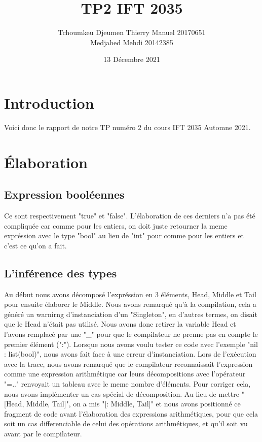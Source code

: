 \documentclass{article}
\title{TP2 IFT 2035}
\author{Tchoumkeu Djeumen Thierry Manuel 20170651
\\ Medjahed Mehdi 20142385}
\date{13 Décembre 2021}
\begin{document}

\section{Introduction}
Voici donc le rapport de notre TP numéro 2 du cours IFT 2035 Automne 2021. 

\section{Élaboration}
\subsection{Expression booléennes}
Ce sont respectivement "true" et "false". L'élaboration de ces derniers n'a pas été compliquée car comme pour les entiers, on doit juste retourner la meme expréssion avec le type "bool" au lieu de "int" pour comme pour les entiers et c'est ce qu'on a fait.

\subsection{L'inférence des types}
Au début nous avons décomposé l'expréssion en 3 éléments, Head, Middle et Tail pour ensuite
    élaborer le Middle. Nous avons remarqué qu'à la compilation, cela a généré un warnirng d'instanciation d'un "Singleton", en d'autres termes,
    on disait que le Head n'était pas utilisé. Nous avons donc retirer la variable Head et l'avons remplacé par une "\_" pour que le compilateur ne 
    prenne pas en compte le premier élément (":"). Lorsque nous avons voulu tester ce code avec l'exemple "nil : list(bool)", nous avons fait face
    à une erreur d'instanciation. Lors de l'exécution avec la trace, nous avons remarqué que le compilateur reconnaissait l'expression comme
    une expression arithmétique car leurs décompositions avec l'opérateur "=.." renvoyait un tableau avec le meme nombre d'éléments.
    Pour corriger cela, nous avons implémenter un cas spécial de décomposition. Au lieu de mettre "[Head, Middle, Tail]", on a mis "[: Middle, Tail]"
    et nous avons positionné ce fragment de code avant l'élaboration des expressions arithmétiques, pour que cela soit un cas differenciable de celui des opérations arithmétiques, 
    et qu'il soit vu avant par le compilateur.
\end{document}
